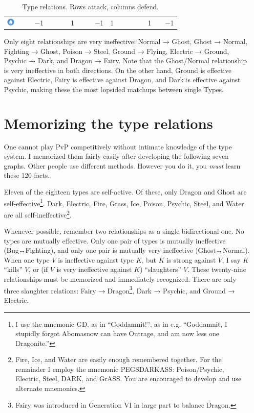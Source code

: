 \begin{table}[ht]
\begin{center}
\begin{tabular}{c g c g c g c g c g c g c g c g c g c}
    \includegraphics[width=1em]{images/water.png} & & & −1 & & & & 1 & & & −1 & 1 & & & & & 1 & & −1 \\ %
\end{tabular}
    \caption[Type relations]{Type relations. Rows attack, columns defend.}
\end{center}
\end{table}

Only eight relationships are very ineffective:
Normal → Ghost,
Ghost → Normal,
Fighting → Ghost,
Poison → Steel,
Ground → Flying,
Electric → Ground,
Psychic → Dark,
and Dragon → Fairy.
Note that the Ghost/Normal relationship is very ineffective in both directions.
On the other hand, Ground is effective against Electric, Fairy is effective
 against Dragon, and Dark is effective against Psychic, making these the most
 lopsided matchups between single Types.

\section{Memorizing the type relations}
One cannot play PvP competitively without intimate knowledge of the type system.
I memorized them fairly easily after developing the following seven graphs.
Other people use different methods.
However you do it, you \textit{must} learn these 120 facts.

Eleven of the eighteen types are self-active.
Of these, only Dragon and Ghost are
  self-effective\footnote{I use the mnemonic GD, as in ``Goddamnit!'', as in e.g.
  ``Goddamnit, I stupidly forgot Abomasnow can have Outrage, and am now less one Dragonite.''}.
Dark, Electric, Fire, Grass, Ice, Poison, Psychic,
 Steel, and Water are all self-ineffective\footnote{
Fire, Ice, and Water are easily enough remembered together.
For the remainder I employ the mnemonic PEGSDARKASS\@:
  Poison/Psychic, Electric, Steel, DARK, and GrASS\@.
You are encouraged to develop and use alternate mnemonics.}.

Whenever possible, remember two relationships as a single bidirectional one.
No types are mutually effective.
  Only one pair of types is mutually ineffective (Bug↔Fighting),
  and only one pair is mutually very ineffective (Ghost↔Normal).
When one type $V$ is ineffective against type $K$, but $K$ is strong
 against $V$, I say $K$ ``kills'' $V$, or
 (if $V$ is very ineffective against $K$) ``slaughters'' $V$.
These twenty-nine relationships must be memorized and immediately recognized.
There are only three slaughter relations: Fairy → Dragon\footnote{Fairy was
  introduced in Generation VI in large part to balance Dragon.}, Dark → Psychic,
  and Ground → Electric.

